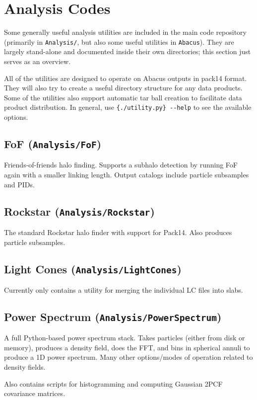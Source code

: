 \documentclass[11pt,preprint]{aastex}
\newenvironment{private}{\comment}{\endcomment}
\newenvironment{private}
    {\textbf{Not public:}\\
    \begin{tabular}{|p{0.9\textwidth}|}
    \hline\\
    }
    {
    \\\\\hline
    \end{tabular}
    }
\begin{document}
\begin{private}
\section{Analysis Codes}
Some generally useful analysis utilities are included in the main code repository (primarily in \verb|Analysis/|,
but also some useful utilities in \verb|Abacus|).
They are largely stand-alone and documented inside their own directories; this section
just serves as an overview.

All of the utilities are designed to operate on Abacus outputs in pack14 format.  They
will also try to create a useful directory structure for any data products.  Some of the
utilities also support automatic tar ball creation to facilitate data product distribution.
In general, use \verb|{./utility.py} --help| to see the available options.

\subsection{FoF (\texttt{Analysis/FoF})}
Friends-of-friends halo finding. Supports a subhalo detection by running FoF again with a smaller
linking length.  Output catalogs include particle subsamples and PIDs.

\subsection{Rockstar (\texttt{Analysis/Rockstar})}
The standard Rockstar halo finder with support for Pack14.  Also produces particle subsamples.

\subsection{Light Cones (\texttt{Analysis/LightCones})}
Currently only contains a utility for merging the individual LC files into slabs.

\subsection{Power Spectrum (\texttt{Analysis/PowerSpectrum})}
A full Python-based power spectrum stack.  Takes particles (either from disk or memory),
produces a density field, does the FFT, and bins in spherical annuli to produce a 1D power spectrum.
Many other options/modes of operation related to density fields.

Also contains scripts for histogramming and computing Gaussian 2PCF covariance matrices.



\end{private}
\end{document}

